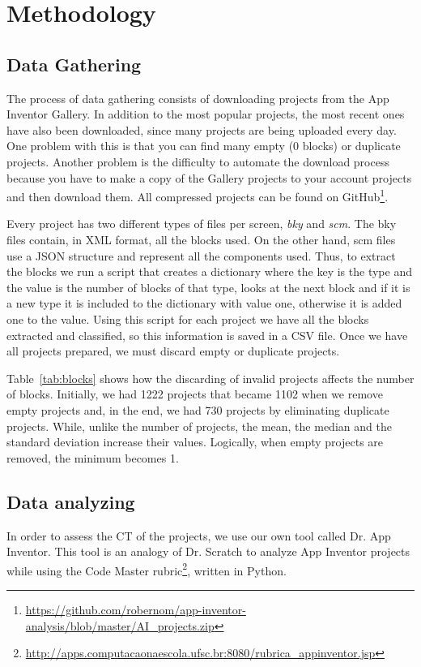 \documentclass[a4paper]{article}
\begin{document}
\section{Methodology}
\subsection{Data Gathering}
The process of data gathering consists of downloading projects from the App Inventor Gallery. In addition to the most popular projects, the most recent ones have also been downloaded, since many projects are being uploaded every day. One problem with this is that you can find many empty (0 blocks) or duplicate projects. Another problem is the difficulty to automate the download process because you have to make a copy of the Gallery projects to your account projects and then download them. All compressed projects can be found on GitHub\footnote{\url{https://github.com/robernom/app-inventor-analysis/blob/master/AI_projects.zip}}.

Every project has two different types of files per screen, \emph{bky} and \emph{scm}. The bky files contain, in XML format, all the blocks used. On the other hand, scm files use a JSON structure and represent all the components used. Thus, to extract the blocks we run a script that creates a dictionary where the key is the type and the value is the number of blocks of that type, looks at the next block and if it is a new type it is included to the dictionary with value one, otherwise it is added one to the value. Using this script for each project we have all the blocks extracted and classified, so this information is saved in a CSV file. Once we have all projects prepared, we must discard empty or duplicate projects. 

Table~\ref{tab:blocks} shows how the discarding of invalid projects affects the number of blocks. Initially, we had 1222 projects that became 1102 when we remove empty projects and, in the end, we had 730 projects by eliminating duplicate projects. While, unlike the number of projects, the mean, the median and the standard deviation increase their values. Logically, when empty projects are removed, the minimum becomes 1.

\subsection{Data analyzing}
In order to assess the CT of the projects, we use our own tool called Dr. App Inventor. This tool is an analogy of Dr. Scratch to analyze App Inventor projects while using the Code Master rubric\footnote{\url{http://apps.computacaonaescola.ufsc.br:8080/rubrica_appinventor.jsp}}, written in Python.
\end{document}
